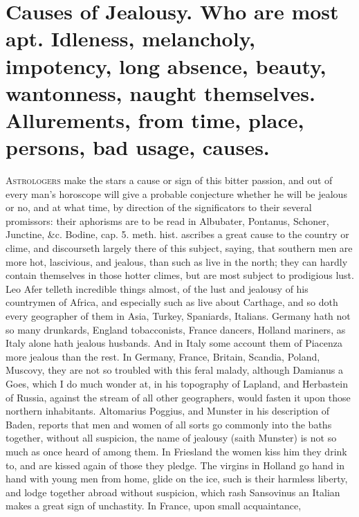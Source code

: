 {%
\section[Causes of Jealousy]{Causes of Jealousy. Who are most apt. Idleness, melancholy, impotency, long absence, beauty, wantonness, naught themselves. Allurements, from time, place, persons, bad usage, causes.}

\lettrine{A}{strologers} make the stars a cause or sign of this bitter passion, and
out of every man's horoscope will give a probable conjecture whether he
will be jealous or no, and at what time, by direction of the
significators to their several promissors: their aphorisms are to be
read in Albubater, Pontanus, Schoner, Junctine, \&c. Bodine, cap. 5.
meth. hist. ascribes a great cause to the country or clime, and
discourseth largely there of this subject, saying, that southern men
are more hot, lascivious, and jealous, than such as live in the north;
they can hardly contain themselves in those hotter climes, but are most
subject to prodigious lust. Leo Afer telleth incredible things almost,
of the lust and jealousy of his countrymen of Africa, and especially
such as live about Carthage, and so doth every geographer of them in
Asia, Turkey, Spaniards, Italians. Germany hath not so many
drunkards, England tobacconists, France dancers, Holland mariners, as
Italy alone hath jealous husbands. And in Italy some account them
of Piacenza more jealous than the rest. In Germany, France,
Britain, Scandia, Poland, Muscovy, they are not so troubled with this
feral malady, although Damianus a Goes, which I do much wonder at, in
his topography of Lapland, and Herbastein of Russia, against the stream
of all other geographers, would fasten it upon those northern
inhabitants. Altomarius Poggius, and Munster in his description of
Baden, reports that men and women of all sorts go commonly into the
baths together, without all suspicion, the name of jealousy (saith
Munster) is not so much as once heard of among them. In Friesland the
women kiss him they drink to, and are kissed again of those they
pledge. The virgins in Holland go hand in hand with young men from
home, glide on the ice, such is their harmless liberty, and lodge
together abroad without suspicion, which rash Sansovinus an Italian
makes a great sign of unchastity. In France, upon small acquaintance,
}
